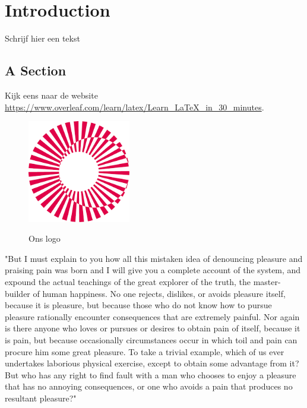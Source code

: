\chapter{Introduction}
\label{chap:intro}
Schrijf hier een tekst
\section{A Section}
\label{sec:section1}

Kijk eens naar de website \url{https://www.overleaf.com/learn/latex/Learn_LaTeX_in_30_minutes}.

\begin{figure}[h!]
\centering
\includegraphics[width=0.4\textwidth]{ucll.png}
\label{fig:logo}
\caption{Ons logo}
\end{figure}

"But I must explain to you how all this mistaken idea of denouncing pleasure and praising pain was born and I will give you a complete account of the system, and expound the actual teachings of the great explorer of the truth, the master-builder of human happiness. No one rejects, dislikes, or avoids pleasure itself, because it is pleasure, but because those who do not know how to pursue pleasure rationally encounter consequences that are extremely painful. Nor again is there anyone who loves or pursues or desires to obtain pain of itself, because it is pain, but because occasionally circumstances occur in which toil and pain can procure him some great pleasure. To take a trivial example, which of us ever undertakes laborious physical exercise, except to obtain some advantage from it? But who has any right to find fault with a man who chooses to enjoy a pleasure that has no annoying consequences, or one who avoids a pain that produces no resultant pleasure?"
